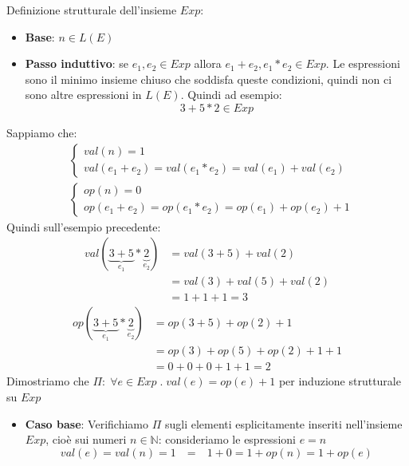 \documentclass[a4paper]{article}
\begin{document}
\begin{Example}{}{}
    Definizione strutturale dell'insieme \( Exp \):
    \begin{itemize}
      \item \textbf{Base}: \( n \in L(E) \)
      \item \textbf{Passo induttivo}: se \( e_1, e_2 \in Exp \) allora
        \( e_1 + e_2, e_1 * e_2 \in Exp \).
        Le espressioni sono il minimo insieme chiuso che soddisfa queste condizioni,
        quindi non ci sono altre espressioni in \( L(E) \). Quindi ad esempio:
        \[
          3 + 5 * 2 \in Exp
        \] 
    \end{itemize}
    Sappiamo che:
    \[
      \begin{aligned}
        &\begin{cases}
          val(n) = 1 \\
          val(e_1 + e_2) = val(e_1 * e_2) = val(e_1) + val(e_2)
        \end{cases} \\
        &\begin{cases}
          op(n) = 0 \\
          op(e_1 + e_2) = op(e_1 * e_2) = op(e_1) + op(e_2) + 1
        \end{cases}
      \end{aligned}
    \] 
    Quindi sull'esempio precedente:
    \[
      \begin{aligned}
        val(\underbrace{3 + 5}_{e_1} * \underbrace{2}_{e_2}) &= val(3 + 5) + val(2) \\
                                                             &= val(3) + val(5) + val(2) \\
                                                             &= 1 + 1 + 1 = 3
      \end{aligned}
    \] 
    \[
      \begin{aligned}
        op(\underbrace{3 + 5}_{e_1} * \underbrace{2}_{e_2}) &= op(3 + 5) + op(2) + 1 \\
                                                            &= op(3) + op(5) + op(2) + 1 + 1 \\
                                                            &= 0 + 0 + 0 + 1 + 1 = 2
      \end{aligned}
    \] 
    Dimostriamo che \( \Pi:\; \forall e \in Exp \;.\; val(e) = op(e) + 1 \) per induzione
    strutturale su \( Exp \) 
    \begin{itemize}
      \item \textbf{Caso base}: Verifichiamo \( \Pi  \) sugli elementi esplicitamente
        inseriti nell'insieme \( Exp \), cioè sui numeri \( n \in \mathbb{N}\):
        consideriamo le espressioni \( e = n \) 
        \[
          val(e) = val(n) = 1 \quad \textbf{=} \quad 1 + 0 = 1 + op(n) = 1 + op(e)
        \] 
  

\end{itemize}
\end{Example}
\end{document}
